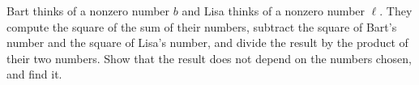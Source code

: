 Bart thinks of a nonzero number $b$ and Lisa thinks of a nonzero number $\ell$. They compute the square of the sum of their numbers, subtract the square of Bart's number and the square of Lisa's number, and divide the result by the product of their two numbers. Show that the result does not depend on the numbers chosen, and find it.
